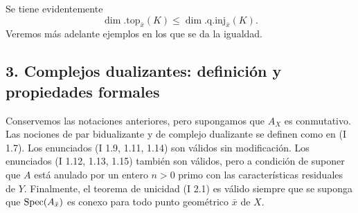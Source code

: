 Se tiene evidentemente
\[
        \dim.\mathrm{top}_{\bar{x}}(K)\leq \dim.\mathrm{q.inj}_{\bar{x}}(K).
\]
Veremos más adelante ejemplos en los que se da la igualdad.

\subsection*{3. Complejos dualizantes: definición y propiedades formales}

Conservemos las notaciones anteriores, pero supongamos que $A_X$ es conmutativo. Las nociones de par bidualizante y de complejo dualizante se definen como en (I 1.7). Los enunciados (I 1.9, 1.11, 1.14) son válidos sin modificación. Los enunciados (I 1.12, 1.13, 1.15) también son válidos, pero a condición de suponer que $A$ está anulado por un entero $n>0$ primo con las características residuales de $Y$. Finalmente, el teorema de unicidad (I 2.1) es válido siempre que se suponga que $\operatorname{Spec}(A_{\bar{x}})$ es conexo para todo punto geométrico $\bar{x}$ de $X$.
